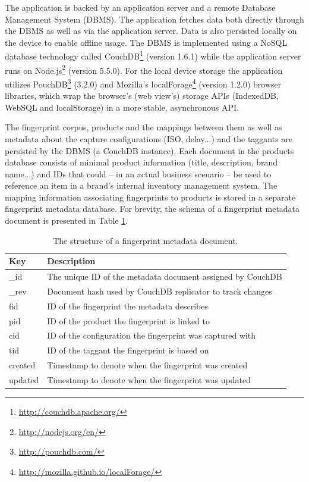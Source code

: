 \documentclass[thesis.tex]{subfiles}
\begin{document}
The application is backed by an application server and a remote Database Management System (DBMS). The application fetches data both directly through the DBMS as well as via the application server. Data is also persisted locally on the device to enable offline usage. The DBMS is implemented using a NoSQL database technology called CouchDB\footnote{\url{http://couchdb.apache.org/}} (version 1.6.1) while the application server runs on Node.js\footnote{\url{http://nodejs.org/en/}} (version 5.5.0). For the local device storage the application utilizes PouchDB\footnote{\url{http://pouchdb.com/}} (3.2.0) and Mozilla's localForage\footnote{\url{http://mozilla.github.io/localForage/}} (version 1.2.0) browser libraries, which wrap the browser's (web view's) storage APIs (IndexedDB, WebSQL and localStorage) in a more stable, asynchronous API.

The fingerprint corpus, products and the mappings between them as well as metadata about the capture configurations (ISO, delay...) and the taggants are persisted by the DBMS (a CouchDB instance). Each document in the products database consists of minimal product information (title, description, brand name...) and IDs that could -- in an actual business scenario -- be used to reference an item in a brand's internal inventory management system. The mapping information associating fingerprints to products is stored in a separate fingerprint metadata database. For brevity, the schema of a fingerprint metadata document is presented in Table \ref{table:fingerprint-metadata-schema}.

\begin{table}[ht]
	\caption{The structure of a fingerprint metadata document.} \label{table:fingerprint-metadata-schema}

	\begin{center}
	\begin{tabular}{| m{1.4cm} | m{11.3cm} |}

		\hline
		\textbf{Key}	& \textbf{Description} \\ \hline
		\_id			& The unique ID of the metadata document assigned by CouchDB \\
		\hline
		\_rev 		& Document hash used by CouchDB replicator to track changes \\
		\hline
		fid 			& ID of the fingerprint the metadata describes \\
		\hline
		pid 			& ID of the product the fingerprint is linked to \\
		\hline
		cid 			& ID of the configuration the fingerprint was captured with \\
		\hline
		tid 			& ID of the taggant the fingerprint is based on \\
		\hline
		created		& Timestamp to denote when the fingerprint was created \\
		\hline
		updated		& Timestamp to denote when the fingerprint was updated \\
		\hline
	\end{tabular}
	\end{center}
\end{table}
\end{document}
